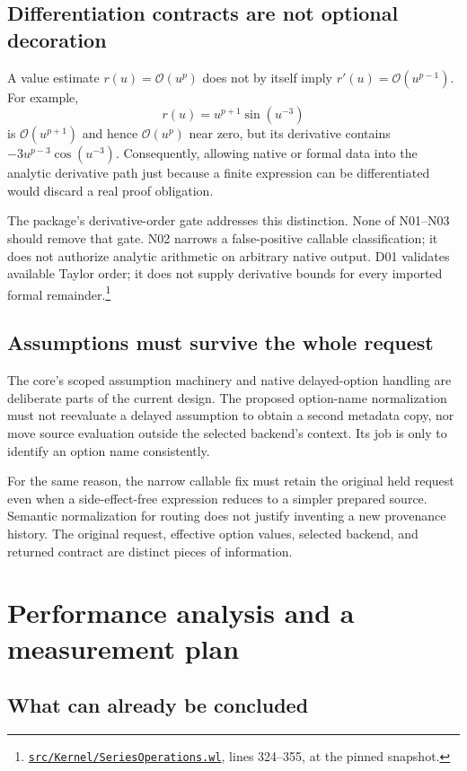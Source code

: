 \documentclass[11pt,letterpaper]{article}
\newcommand{\sr}[3]{\footnote{\href{https://github.com/VladimirReshetnikov/Asymptotic/blob/6687962f3c858a4f93623cfc496f33e35c6763d4/#1\#L#2-L#3}{\nolinkurl{#1}}, lines #2--#3, at the pinned snapshot.}}
\newcommand{\OO}{\mathcal O}
\begin{document}
\subsection{Differentiation contracts are not optional decoration}

A value estimate $r(u)=\OO(u^p)$ does not by itself imply $r'(u)=\OO(u^{p-1})$. For example,
\[
 r(u)=u^{p+1}\sin(u^{-3})
\]
is $\OO(u^{p+1})$ and hence $\OO(u^p)$ near zero, but its derivative contains $-3u^{p-3}\cos(u^{-3})$. Consequently, allowing native or formal data into the analytic derivative path just because a finite expression can be differentiated would discard a real proof obligation.

The package's derivative-order gate addresses this distinction. None of N01--N03 should remove that gate. N02 narrows a false-positive callable classification; it does not authorize analytic arithmetic on arbitrary native output. D01 validates available Taylor order; it does not supply derivative bounds for every imported formal remainder.\sr{src/Kernel/SeriesOperations.wl}{324}{355}

\subsection{Assumptions must survive the whole request}

The core's scoped assumption machinery and native delayed-option handling are deliberate parts of the current design. The proposed option-name normalization must not reevaluate a delayed assumption to obtain a second metadata copy, nor move source evaluation outside the selected backend's context. Its job is only to identify an option name consistently.

For the same reason, the narrow callable fix must retain the original held request even when a side-effect-free expression reduces to a simpler prepared source. Semantic normalization for routing does not justify inventing a new provenance history. The original request, effective option values, selected backend, and returned contract are distinct pieces of information.

\section{Performance analysis and a measurement plan}

\subsection{What can already be concluded}
\end{document}
